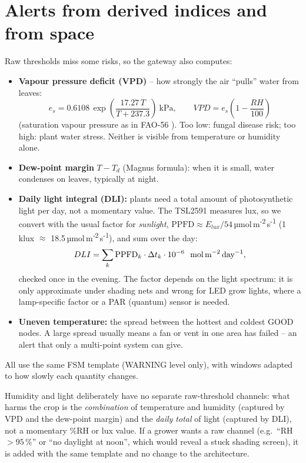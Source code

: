 \documentclass[11pt,a4paper]{report}
\begin{document}
\section{Alerts from derived indices and from space}\label{sec:derived}
Raw thresholds miss some risks, so the gateway also computes:
\begin{itemize}
  \item \textbf{Vapour pressure deficit (VPD)} -- how strongly the air ``pulls'' water from leaves:
  \begin{equation}
    e_s = 0.6108\,\exp\!\left(\frac{17.27\,T}{T + 237.3}\right)\ \text{kPa}, \qquad VPD = e_s\left(1 - \frac{RH}{100}\right)
  \end{equation}
  (saturation vapour pressure as in FAO-56 \cite{fao}).
  Too low: fungal disease risk; too high: plant water stress. Neither is visible from temperature or humidity alone.
  \item \textbf{Dew-point margin} $T - T_d$ (Magnus formula): when it is small, water condenses on leaves, typically at night.
  \item \textbf{Daily light integral (DLI):} plants need a total amount of photosynthetic light per day, not a momentary value. The TSL2591 measures lux, so we convert with the usual factor for \emph{sunlight}, $\mathrm{PPFD} \approx E_{lux}/54$\,µmol\,m\textsuperscript{-2}\,s\textsuperscript{-1} (1\,klux $\approx$ 18.5\,µmol\,m\textsuperscript{-2}\,s\textsuperscript{-1}), and sum over the day:
  \begin{equation}
    DLI = \sum_k \mathrm{PPFD}_k \cdot \Delta t_k \cdot 10^{-6}\ \ \text{mol\,m}^{-2}\,\text{day}^{-1},
  \end{equation}
  checked once in the evening. The factor depends on the light spectrum: it is only approximate under shading nets and wrong for LED grow lights, where a lamp-specific factor or a PAR (quantum) sensor is needed.
  \item \textbf{Uneven temperature:} the spread between the hottest and coldest GOOD nodes. A large spread usually means a fan or vent in one area has failed -- an alert that only a multi-point system can give.
\end{itemize}
All use the same FSM template (WARNING level only), with windows adapted to how slowly each quantity changes.

Humidity and light deliberately have no separate raw-threshold channels: what harms the crop is the \emph{combination} of temperature and humidity (captured by VPD and the dew-point margin) and the \emph{daily total} of light (captured by DLI), not a momentary \%RH or lux value. If a grower wants a raw channel (e.g.\ ``RH $> 95$\,\%'' or ``no daylight at noon'', which would reveal a stuck shading screen), it is added with the same template and no change to the architecture.
\end{document}
